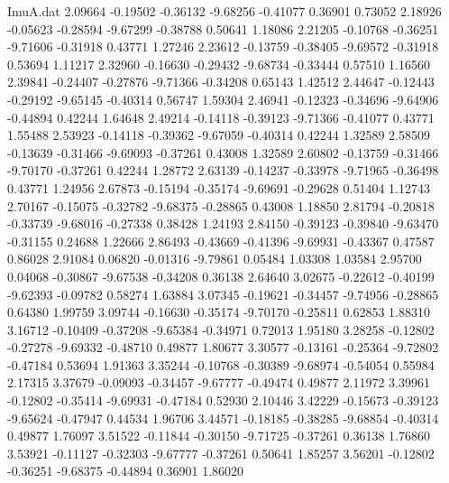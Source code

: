 \begin{filecontents}{ImuA.dat}
   2.09664   -0.19502   -0.36132   -9.68256   -0.41077    0.36901    0.73052
   2.18926   -0.05623   -0.28594   -9.67299   -0.38788    0.50641    1.18086
   2.21205   -0.10768   -0.36251   -9.71606   -0.31918    0.43771    1.27246
   2.23612   -0.13759   -0.38405   -9.69572   -0.31918    0.53694    1.11217
   2.32960   -0.16630   -0.29432   -9.68734   -0.33444    0.57510    1.16560
   2.39841   -0.24407   -0.27876   -9.71366   -0.34208    0.65143    1.42512
   2.44647   -0.12443   -0.29192   -9.65145   -0.40314    0.56747    1.59304
   2.46941   -0.12323   -0.34696   -9.64906   -0.44894    0.42244    1.64648
   2.49214   -0.14118   -0.39123   -9.71366   -0.41077    0.43771    1.55488
   2.53923   -0.14118   -0.39362   -9.67059   -0.40314    0.42244    1.32589
   2.58509   -0.13639   -0.31466   -9.69093   -0.37261    0.43008    1.32589
   2.60802   -0.13759   -0.31466   -9.70170   -0.37261    0.42244    1.28772
   2.63139   -0.14237   -0.33978   -9.71965   -0.36498    0.43771    1.24956
   2.67873   -0.15194   -0.35174   -9.69691   -0.29628    0.51404    1.12743
   2.70167   -0.15075   -0.32782   -9.68375   -0.28865    0.43008    1.18850
   2.81794   -0.20818   -0.33739   -9.68016   -0.27338    0.38428    1.24193
   2.84150   -0.39123   -0.39840   -9.63470   -0.31155    0.24688    1.22666
   2.86493   -0.43669   -0.41396   -9.69931   -0.43367    0.47587    0.86028
   2.91084    0.06820   -0.01316   -9.79861    0.05484    1.03308    1.03584
   2.95700    0.04068   -0.30867   -9.67538   -0.34208    0.36138    2.64640
   3.02675   -0.22612   -0.40199   -9.62393   -0.09782    0.58274    1.63884
   3.07345   -0.19621   -0.34457   -9.74956   -0.28865    0.64380    1.99759
   3.09744   -0.16630   -0.35174   -9.70170   -0.25811    0.62853    1.88310
   3.16712   -0.10409   -0.37208   -9.65384   -0.34971    0.72013    1.95180
   3.28258   -0.12802   -0.27278   -9.69332   -0.48710    0.49877    1.80677
   3.30577   -0.13161   -0.25364   -9.72802   -0.47184    0.53694    1.91363
   3.35244   -0.10768   -0.30389   -9.68974   -0.54054    0.55984    2.17315
   3.37679   -0.09093   -0.34457   -9.67777   -0.49474    0.49877    2.11972
   3.39961   -0.12802   -0.35414   -9.69931   -0.47184    0.52930    2.10446
   3.42229   -0.15673   -0.39123   -9.65624   -0.47947    0.44534    1.96706
   3.44571   -0.18185   -0.38285   -9.68854   -0.40314    0.49877    1.76097
   3.51522   -0.11844   -0.30150   -9.71725   -0.37261    0.36138    1.76860
   3.53921   -0.11127   -0.32303   -9.67777   -0.37261    0.50641    1.85257
   3.56201   -0.12802   -0.36251   -9.68375   -0.44894    0.36901    1.86020

\end{filecontents}
